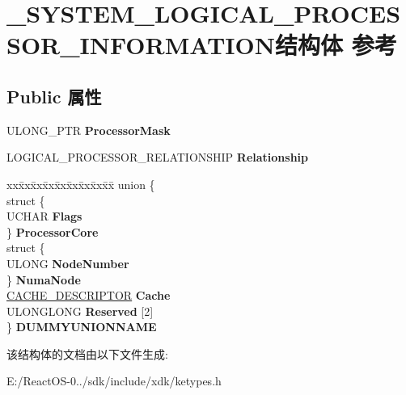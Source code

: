 \hypertarget{struct___s_y_s_t_e_m___l_o_g_i_c_a_l___p_r_o_c_e_s_s_o_r___i_n_f_o_r_m_a_t_i_o_n}{}\section{\+\_\+\+S\+Y\+S\+T\+E\+M\+\_\+\+L\+O\+G\+I\+C\+A\+L\+\_\+\+P\+R\+O\+C\+E\+S\+S\+O\+R\+\_\+\+I\+N\+F\+O\+R\+M\+A\+T\+I\+O\+N结构体 参考}
\label{struct___s_y_s_t_e_m___l_o_g_i_c_a_l___p_r_o_c_e_s_s_o_r___i_n_f_o_r_m_a_t_i_o_n}
\subsection*{Public 属性}
\begin{DoxyCompactItemize}
\item 
\mbox{\label{struct___s_y_s_t_e_m___l_o_g_i_c_a_l___p_r_o_c_e_s_s_o_r___i_n_f_o_r_m_a_t_i_o_n_ae7a673579b6dab3b4fb64a802af0773d}} 
U\+L\+O\+N\+G\+\_\+\+P\+TR {\bfseries Processor\+Mask}
\item 
\mbox{\label{struct___s_y_s_t_e_m___l_o_g_i_c_a_l___p_r_o_c_e_s_s_o_r___i_n_f_o_r_m_a_t_i_o_n_a25dd998142015780ccba482aa9f3b26b}} 
L\+O\+G\+I\+C\+A\+L\+\_\+\+P\+R\+O\+C\+E\+S\+S\+O\+R\+\_\+\+R\+E\+L\+A\+T\+I\+O\+N\+S\+H\+IP {\bfseries Relationship}
\item 
\mbox{\label{struct___s_y_s_t_e_m___l_o_g_i_c_a_l___p_r_o_c_e_s_s_o_r___i_n_f_o_r_m_a_t_i_o_n_a46631efe3e1e3724b31fe91955d6ec8d}} 
\begin{tabbing}
xx\=xx\=xx\=xx\=xx\=xx\=xx\=xx\=xx\=\kill
union \{\\
\>struct \{\\
\>\>UCHAR {\bfseries Flags}\\
\>\} {\bfseries ProcessorCore}\\
\>struct \{\\
\>\>ULONG {\bfseries NodeNumber}\\
\>\} {\bfseries NumaNode}\\
\>\hyperlink{struct___c_a_c_h_e___d_e_s_c_r_i_p_t_o_r}{CACHE\_DESCRIPTOR} {\bfseries Cache}\\
\>ULONGLONG {\bfseries Reserved} \mbox{[}2\mbox{]}\\
\} {\bfseries DUMMYUNIONNAME}\\

\end{tabbing}\end{DoxyCompactItemize}


该结构体的文档由以下文件生成\+:\begin{DoxyCompactItemize}
\item 
E\+:/\+React\+O\+S-\/0../sdk/include/xdk/ketypes.\+h\end{DoxyCompactItemize}
